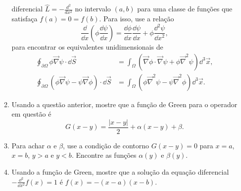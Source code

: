 \begin{enumerate}
\begin{enumerate}
		            diferencial $\hat{L} = -\frac{d^2}{dx^2}$ no intervalo $(a, b)$ para
		            uma classe de funções que satisfaça $f(a) = 0 = f(b)$. Para isso, use
		            a relação
		            $$\frac{\dd}{\dd x}\left(\phi \frac{\dd\psi}{\dd x}\right) =
			            \frac{\dd\phi}{\dd x}\frac{\dd\psi}{\dd x} + \phi\frac{\dd^2\psi}{\dd x^2},
		            $$
		            para encontrar os equivalentes unidimensionais de
		            \begin{align}
			            \oint_{\partial\Omega}\phi\vec\nabla\psi\cdot\dd\vec{S}                                 & =
			            \int_{\Omega}\left(\vec\nabla\phi\cdot\vec\nabla\psi+\phi\vec\nabla^2\psi\right)\dd^3\vec{x}, \\
			            \oint_{\partial\Omega}\left(\phi\vec\nabla\psi-\psi\vec\nabla\phi\right)\cdot\dd\vec{S} & =
			            \int_{\Omega}\left(\phi\vec\nabla^2\psi-\psi\vec\nabla^2\phi\right)\dd^3\vec{x}.
		            \end{align}
		      \item Usando a questão anterior, mostre que a função de Green para o
		            operador em questão é
		            $$G(x-y) = \frac{|x-y|}{2}+\alpha (x-y) + \beta.$$
		      \item Para achar $\alpha$ e $\beta$, use a condição de contorno
		            $G(x-y) = 0$ para $x = a$, $x = b$, $y > a$ e $y < b$. Encontre as funções $\alpha(y)$
		            e $\beta(y)$.
		      \item Usando a função de Green, mostre que a solução da equação
		            diferencial $-\frac{\dd^2}{\dd x^2}f(x) = 1$ é
		            $f(x) = -(x-a)(x-b).$
	      \end{enumerate}
\end{enumerate}

